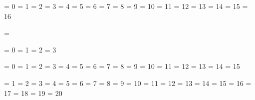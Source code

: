 

\unprotect


\chardef\@@bottomlevelgroup   =  0
\chardef\@@simplegroup        =  1
\chardef\@@hboxgroup          =  2
\chardef\@@adjustedhboxgroup  =  3
\chardef\@@vboxgroup          =  4
\chardef\@@vtopgroup          =  5
\chardef\@@aligngroup         =  6
\chardef\@@noaligngroup       =  7
\chardef\@@outputgroup        =  8
\chardef\@@mathgroup          =  9
\chardef\@@discretionarygroup = 10
\chardef\@@insertgroup        = 11
\chardef\@@vcentergroup       = 12
\chardef\@@mathchoicegroup    = 13
\chardef\@@semisimplegroup    = 14
\chardef\@@mathshiftgroup     = 15
\chardef\@@mathleftgroup      = 16

\chardef\@@vadjustgroup       = \@@insertgroup


\chardef\@@batchmode     = 0
\chardef\@@nonstopmode   = 1
\chardef\@@scrollmode    = 2
\chardef\@@errorstopmode = 3


\chardef\@@charnode          =  0
\chardef\@@hlistnode         =  1
\chardef\@@vlistnode         =  2
\chardef\@@rulenode          =  3
\chardef\@@insertnode        =  4
\chardef\@@marknode          =  5
\chardef\@@adjustnode        =  6
\chardef\@@ligaturenode      =  7
\chardef\@@discretionarynode =  8
\chardef\@@whatsitnode       =  9
\chardef\@@mathnode          = 10
\chardef\@@gluenode          = 11
\chardef\@@kernnode          = 12
\chardef\@@penaltynode       = 13
\chardef\@@unsetnode         = 14
\chardef\@@mathsnode         = 15


\chardef\@@charif     =  1
\chardef\@@catif      =  2
\chardef\@@numif      =  3
\chardef\@@dimif      =  4
\chardef\@@oddif      =  5
\chardef\@@vmodeif    =  6
\chardef\@@hmodeif    =  7
\chardef\@@mmodeif    =  8
\chardef\@@innerif    =  9
\chardef\@@voidif     = 10
\chardef\@@hboxif     = 11
\chardef\@@vboxif     = 12
\chardef\@@xif        = 13
\chardef\@@eofif      = 14
\chardef\@@trueif     = 15
\chardef\@@falseif    = 16
\chardef\@@caseif     = 17
\chardef\@@definedif  = 18
\chardef\@@csnameif   = 19
\chardef\@@fontcharif = 20

